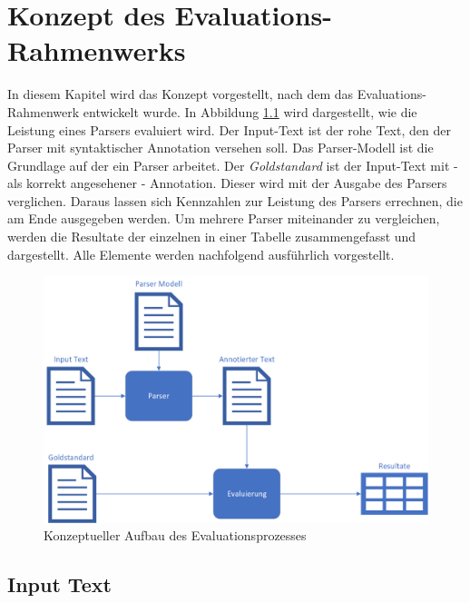 %
\chapter{Konzept des Evaluations-Rahmenwerks}
\label{sec:konzept}

In diesem Kapitel wird das Konzept vorgestellt, nach dem das Evaluations-Rahmenwerk entwickelt wurde. In Abbildung \ref{fig:konzept-aufbau} wird dargestellt, wie die Leistung eines Parsers evaluiert wird. Der Input-Text ist der rohe Text, den der Parser mit syntaktischer Annotation versehen soll. Das Parser-Modell ist die Grundlage auf der ein Parser arbeitet. Der \textit{Goldstandard} ist der Input-Text mit - als korrekt angesehener - Annotation. Dieser wird mit der Ausgabe des Parsers verglichen. Daraus lassen sich Kennzahlen zur Leistung des Parsers errechnen, die am Ende ausgegeben werden.
Um mehrere Parser miteinander zu vergleichen, werden die Resultate der einzelnen in einer Tabelle zusammengefasst und dargestellt. Alle Elemente werden nachfolgend ausführlich vorgestellt. 
\begin{figure} [h]

\includegraphics[width=\textwidth]{gfx/konzept-aufbau-png.png} 
\caption{Konzeptueller Aufbau des Evaluationsprozesses}	
\label{fig:konzept-aufbau}	
\end{figure}
		
\section{Input Text}

